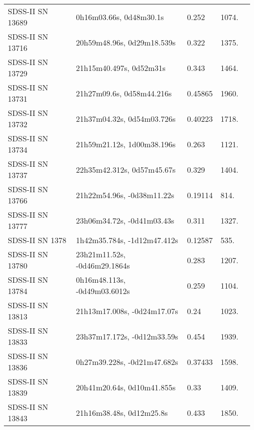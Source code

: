 \begin{longtable}{lllll}
 SDSS-II SN 13689 &        0h16m03.66s, 0d48m30.1s &    0.252 &          1074. &    \citet{2010ApJ...713.1026D} \\
 SDSS-II SN 13716 &     20h59m48.96s, 0d29m18.539s &    0.322 &          1375. &    \citet{2011ApJ...738..162S} \\
 SDSS-II SN 13729 &        21h15m40.497s, 0d52m31s &    0.343 &          1464. &    \citet{2010ApJ...713.1026D} \\
 SDSS-II SN 13731 &      21h27m09.6s, 0d58m44.216s &  0.45865 &          1960. &    \citet{2016SDSSD.C...0000:} \\
 SDSS-II SN 13732 &     21h37m04.32s, 0d54m03.726s &  0.40223 &          1718. &    \citet{2016SDSSD.C...0000:} \\
 SDSS-II SN 13734 &     21h59m21.12s, 1d00m38.196s &    0.263 &          1121. &    \citet{2011ApJ...738..162S} \\
 SDSS-II SN 13737 &     22h35m42.312s, 0d57m45.67s &    0.329 &          1404. &    \citet{2010ApJ...713.1026D} \\
 SDSS-II SN 13766 &     21h22m54.96s, -0d38m11.22s &  0.19114 &           814. &    \citet{2016SDSSD.C...0000:} \\
 SDSS-II SN 13777 &     23h06m34.72s, -0d41m03.43s &    0.311 &          1327. &    \citet{2011ApJ...738..162S} \\
  SDSS-II SN 1378 &    1h42m35.784s, -1d12m47.412s &  0.12587 &           535. &    \citet{2016SDSSD.C...0000:} \\
 SDSS-II SN 13780 &   23h21m11.52s, -0d46m29.1864s &    0.283 &          1207. &    \citet{2005ApJS..158..161H} \\
 SDSS-II SN 13784 &   0h16m48.113s, -0d49m03.6012s &    0.259 &          1104. &    \citet{2011ApJ...738..162S} \\
 SDSS-II SN 13813 &    21h13m17.008s, -0d24m17.07s &     0.24 &          1023. &    \citet{2010ApJ...713.1026D} \\
 SDSS-II SN 13833 &    23h37m17.172s, -0d12m33.59s &    0.454 &          1939. &    \citet{2011ApJ...738..162S} \\
 SDSS-II SN 13836 &    0h27m39.228s, -0d21m47.682s &  0.37433 &          1598. &    \citet{2016SDSSD.C...0000:} \\
 SDSS-II SN 13839 &     20h41m20.64s, 0d10m41.855s &     0.33 &          1409. &    \citet{2011ApJ...738..162S} \\
 SDSS-II SN 13843 &       21h16m38.48s, 0d12m25.8s &    0.433 &          1850. &    \citet{2010ApJ...713.1026D} \\

\end{longtable}
